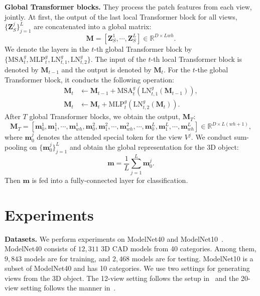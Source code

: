 \documentclass{bmvc2k}
\begin{document}
\noindent \textbf{Global Transformer blocks.} They process the patch features from each view, jointly. At first, the output of the last local Transformer block for all views, $\{\mathbf{Z}^j_S \}_{j=1}^L$  are concatenated into a global matrix:
\begin{equation}
    \mathbf{M} = [\mathbf{Z}^1_S,\cdots,\mathbf{Z}^L_S ] \in \mathbb{R}^{D\times Lwh}.
\end{equation}
We denote the layers in the $t$-th global Transformer block by $\{\mathrm{MSA}_t^g,\mathrm{MLP}_t^g, \mathrm{LN}_{t,1}^g,\mathrm{LN}_{t,2}^g\}$.  The input of the $t$-th local Transformer block  is denoted by $\mathbf{M}_{t-1}$  and the output is denoted  by $\mathbf{M}_{t}$.  For the $t$-the global Transformer block, it conducts the following operation:
\begin{equation}
    \begin{split}
     \mathbf{M}_t    &\gets  \mathbf{M}_{t-1} + \mathrm{MSA}_t^g(\mathrm{LN}^g_{t,1}(\mathbf{M}_{t-1})),\\\mathbf{M}_t   &\gets  \mathbf{M}_t + \mathrm{MLP}_{t}^g(\mathrm{LN}_{t,2}^g(\mathbf{M}_t)).
    \end{split}
\end{equation}
After $T$ global Transformer blocks, we obtain the output, $ \mathbf{M}_{T}$:
\begin{equation}
    \mathbf{M}_{T} = [\mathbf{m}_0^1,\mathbf{m}_1^1,\cdots,\mathbf{m}_{wh}^1,\mathbf{m}_0^2,\mathbf{m}_1^2,\cdots,\mathbf{m}_{wh}^2,\cdots, \mathbf{m}_0^L,\mathbf{m}_1^L,\cdots,\mathbf{m}_{wh}^L] \in \mathbb{R}^{D\times L(wh+1)},
\end{equation}
where $\mathbf{m}_0^{j}$ denotes the attended  special token for the view $V^j$. We conduct sum-pooling on $\{\mathbf{m}_0^{j}\}_{j=1}^L$ and obtain the global representation for the 3D object:
\begin{equation}
    \mathbf{m} = \frac{1}{L} \sum_{j=1}^L \mathbf{m}_0^{j}.
\end{equation}
Then $\mathbf{m}$ is fed into a fully-connected layer for classification.


\vspace{-0.1in}
\section{Experiments}

\vspace{-0.1in}


\textbf{Datasets.}
We perform experiments on ModelNet40 and ModelNet10~\cite{wu20153d}. ModelNet40 consists of $12,311$ 3D CAD models from 40 categories. 
Among them, $9,843$ models are for training, and $2,468$ models are for testing. ModelNet10 is a subset of ModelNet40 and has 10 categories.
We use two settings for generating views from the 3D object.
The 12-view setting follows the setup in~\cite{wang2017dominant} and the 20-view setting follows the manner in~\cite{kanezaki2018rotationnet}.
\end{document}
